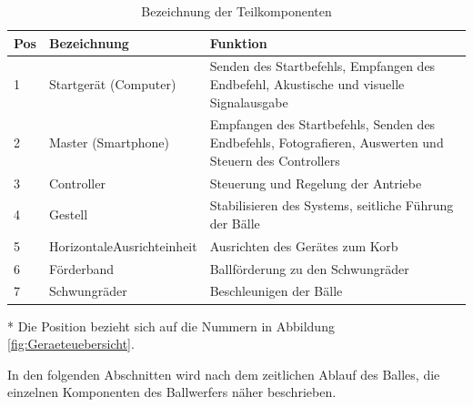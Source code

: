 \begin{table}[h!]
		\centering
	\begin{threeparttable} 
		\begin{tabular}{p{8mm}p{3.5cm}p{8.1cm}}
		    \textbf{Pos}\tnote{*} & \textbf{Bezeichnung} & \textbf{Funktion} \\ 
			\hline\rule{0pt}{11pt} 1 & Startgerät (Computer) & Senden des Startbefehls, Empfangen des Endbefehl, 
			Akustische und visuelle Signalausgabe \\ 
			    \rule{0pt}{11pt}   2 & Master  (Smartphone) & Empfangen des Startbefehls, Senden des Endbefehls,
			Fotografieren, Auswerten und Steuern des Controllers \\ 
			  \rule{0pt}{11pt}     3 & Controller & Steuerung und Regelung der Antriebe \\ 
			  \rule{0pt}{11pt}     4 & Gestell & Stabilisieren des Systems,	seitliche Führung der Bälle \\ 
			   \rule{0pt}{11pt}    5 & Horizontale\newline Ausrichteinheit & Ausrichten des Gerätes zum Korb \\ 
			   \rule{0pt}{11pt}    6 & Förderband & Ballförderung zu den Schwungräder \\ 
			   \rule{0pt}{11pt}    7 & Schwungräder & Beschleunigen der Bälle \\ 
		\end{tabular}
		\caption{Bezeichnung der Teilkomponenten}	
		\label{tab:BezTeilkomponenten}
		\begin{tablenotes}\footnotesize 
			\item[*] Die Position bezieht sich auf die Nummern in Abbildung \ref{fig:Geraeteuebersicht}.
		\end{tablenotes}
	\end{threeparttable} 
\end{table}
\parindent 0pt In den folgenden Abschnitten wird nach dem zeitlichen Ablauf des Balles, 
die einzelnen Komponenten des Ballwerfers näher beschrieben. 
